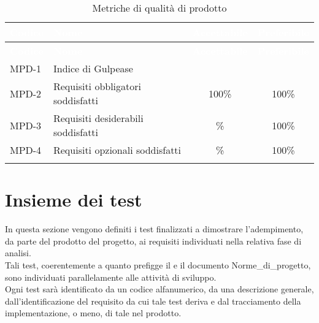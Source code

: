 {
\setlength{\tabcolsep}{10pt}
\renewcommand{\arraystretch}{1.5}
\begin{xltabular}{\textwidth}{| l | X | c | c |}
    \hline
     \textbf{\textcolor{white}{Codice}} & \textbf{\textcolor{white}{Nome}} & \textbf{\textcolor{white}{Accettabile}} & \textbf{\textcolor{white}{Preferibile}} \\
    \hline
    \endfirsthead
    \hline
     \textbf{\textcolor{white}{Codice}} & \textbf{\textcolor{white}{Nome}} & \textbf{\textcolor{white}{Accettabile}} & \textbf{\textcolor{white}{Preferibile}} \\ 
    \endhead
    MPD-1 & Indice di Gulpease &  &  \\
    \hline
    MPD-2 & Requisiti obbligatori soddisfatti & 100\% & 100\% \\
    \hline
    MPD-3 & Requisiti desiderabili soddisfatti & \% & 100\% \\
    \hline
    MPD-4 & Requisiti opzionali soddisfatti & \% & 100\% \\
    \hline
     \caption{Metriche di qualità di prodotto}
    \label{tab:mpd}
\end{xltabular}
}

\section{Insieme dei test} \label{sec:test}
In questa sezione vengono definiti i test finalizzati a dimostrare l'adempimento, da parte del prodotto del progetto, ai requisiti individuati nella relativa fase di analisi.\\
Tali test, coerentemente a quanto prefigge il  e il documento Norme\_di\_progetto, sono individuati parallelamente alle attività di sviluppo.\\
Ogni test sarà identificato da un codice alfanumerico, da una descrizione generale, dall'identificazione del requisito da cui tale test deriva e dal tracciamento della implementazione, o meno, di tale nel prodotto.

